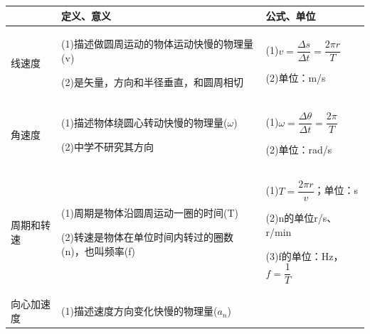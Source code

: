 \documentclass[cn,10.5pt,chinese,mac,chinesefont=founder]{elegantbook}
\begin{document}
\begin{longtable}[]{@{}m{2cm}m{9cm}m{4cm}@{}}
\toprule
& 定义、意义 & 公式、单位\tabularnewline
\midrule
\endhead
\begin{minipage}[t]{0.50\columnwidth}\raggedright
线速度\strut
\end{minipage} & \begin{minipage}[t]{0.60\columnwidth}\raggedright
(1)描述做圆周运动的物体运动快慢的物理量(v)

(2)是矢量，方向和半径垂直，和圆周相切\strut
\end{minipage} & \begin{minipage}[t]{0.30\columnwidth}\raggedright
(1)$v=\dfrac{\Delta s}{\Delta t}=\dfrac{2 \pi r}{T}$

(2)单位：m/s\strut
\end{minipage}\tabularnewline
\begin{minipage}[t]{0.50\columnwidth}\raggedright
角速度\strut
\end{minipage} & \begin{minipage}[t]{1\columnwidth}\raggedright
(1)描述物体绕圆心转动快慢的物理量($\omega$)

(2)中学不研究其方向\strut
\end{minipage} & \begin{minipage}[t]{0.50\columnwidth}\raggedright
(1)$\omega=\dfrac{\Delta \theta}{\Delta t}=\dfrac{2 \pi}{T}$

(2)单位：rad/s\strut
\end{minipage}\tabularnewline
\begin{minipage}[t]{0.50\columnwidth}\raggedright
周期和转速\strut
\end{minipage} & \begin{minipage}[t]{0.60\columnwidth}\raggedright
(1)周期是物体沿圆周运动一圈的时间(T)

(2)转速是物体在单位时间内转过的圈数(n)，也叫频率(f)\strut
\end{minipage} & \begin{minipage}[t]{0.30\columnwidth}\raggedright
(1)$T=\dfrac{2\pi r}{v}$；单位：s

(2)n的单位r/s、r/min

(3)f的单位：Hz，$f=\dfrac{1}{T}$\strut
\end{minipage}\tabularnewline
\begin{minipage}[t]{0.50\columnwidth}\raggedright
向心加速度\strut
\end{minipage} & \begin{minipage}[t]{0.60\columnwidth}\raggedright
(1)描述速度方向变化快慢的物理量($a_n$)


\end{minipage}
\end{longtable}
\end{document}
